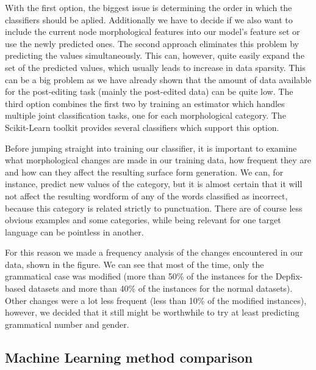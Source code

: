 With the first option, the biggest issue is determining the order in which the classifiers
should be aplied. Additionally we have to decide if we also want to include the current node morphological features
into our model's feature set or use the newly predicted ones. The second approach eliminates this problem by predicting the
values simultaneously. This can, however, quite easily expand the set of the predicted values,
which usually leads to increase in data sparsity. This can be a big problem as we have
already shown that the amount of data available for the post-editing task (mainly the post-edited
data) can be quite low. The third option combines the first two by training an estimator
which handles multiple joint classification tasks, one for each morphological category. The
Scikit-Learn toolkit provides several classifiers which support this option.

Before jumping straight into training our classifier, it is important to examine what morphological
changes are made in our training data, how frequent they are and how can they affect the resulting
surface form generation. We can, for instance, predict new values of the  category,
but it is almost certain that it will not affect the resulting wordform of any of the words
classified as incorrect, because this category is related strictly to punctuation. There are
of course less obvious examples and some categories, while being relevant for one target language
can be pointless in another.

For this reason we made a frequency analysis of the changes encountered
in our data, shown in the figure. We can see that most of the time, only the grammatical
case was modified (more than 50\% of the instances for the Depfix-based datasets and more than 40\% of the instances for
the normal datasets). Other changes were a lot less frequent (less than 10\% of the modified instances), however,
we decided that it still might be worthwhile to try at least predicting grammatical number and gender.

\subsection{Machine Learning method comparison}

